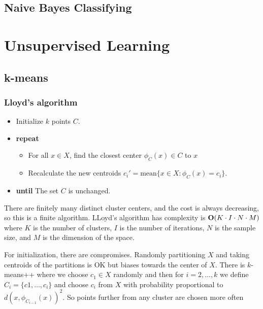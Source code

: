 \documentclass[12pt]{article}
\begin{document}
\cite{Burges2004}

\subsection{Naive Bayes Classifying }


\printbibliography[heading=subbibnumbered]

\pagebreak

\section{Unsupervised Learning}
\newrefsection

\subsection{k-means}

\subsubsection{Lloyd's algorithm}

\begin{itemize}
\item Initialize $k$ points $C$.
\item {\bf repeat}
  \begin{itemize}
  \item For all $x\in X$, find the closest center $\phi_C(x)\in C$ to $x$
  \item Recalculate the new centroids $c_i' = \text{mean}\{x\in X: \phi_C(x) = c_i\}$.
  \end{itemize}
\item {\bf until} The set $C$ is unchanged.
\end{itemize}

There are finitely many distinct cluster centers, and the cost is always
decreasing, so this is a finite algorithm. LLoyd's algorithm has complexity is ${\bf O}(K\cdot I \cdot N \cdot M)$ where $K$ is the number of
clusters, $I$ is the number of iterations, $N$ is the sample size, and $M$ is
the dimension of the space.

For initialization, there are compromises. Randomly partitioning $X$ and taking
centroids of the partitions is OK but biases towards the center of $X$. There is
$k$-means++ where we choose $c_1\in X$ randomly and then for $i=2,\ldots,k$ we
define $C_i = \{c1,\ldots, c_i\}$ and 
choose $c_i$ from $X$ with probability proportional to
$d(x,\phi_{C_{i-1}}(x))^2$. So points further from any cluster are chosen more often
\end{document}
